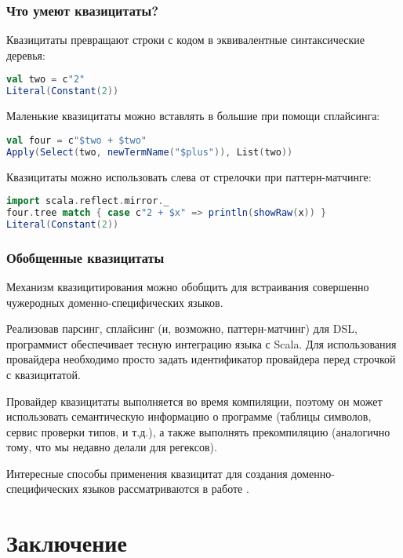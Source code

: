 \documentclass[hyperref={bookmarks=false}]{beamer}
\begin{document}
\begin{frame}[t,fragile]
\frametitle{Что умеют квазицитаты?}

Квазицитаты превращают строки с кодом в эквивалентные синтаксические деревья:

\begin{lstlisting}[language=scala]
val two = c"2"
Literal(Constant(2))
\end{lstlisting}

Маленькие квазицитаты можно вставлять в большие при помощи сплайсинга:

\begin{lstlisting}[language=scala]
val four = c"$two + $two"
Apply(Select(two, newTermName("$plus")), List(two))
\end{lstlisting}%

Квазицитаты можно использовать слева от стрелочки при паттерн-матчинге:

\begin{lstlisting}[language=scala]
import scala.reflect.mirror._
four.tree match { case c"2 + $x" => println(showRaw(x)) }
Literal(Constant(2))
\end{lstlisting}%
\end{frame}

\begin{frame}[t,fragile]
\frametitle{Обобщенные квазицитаты}
Механизм квазицитирования можно обобщить для встраивания совершенно чужеродных доменно-специфических языков.

Реализовав парсинг, сплайсинг (и, возможно, паттерн-матчинг) для DSL, программист обеспечивает тесную интеграцию языка с Scala. Для использования провайдера необходимо просто задать идентификатор провайдера перед строчкой с квазицитатой.

Провайдер квазицитаты выполняется во время компиляции, поэтому он может использовать семантическую информацию о программе (таблицы символов, сервис проверки типов, и т.д.), а также выполнять прекомпиляцию (аналогично тому, что мы недавно делали для регексов).

Интересные способы применения квазицитат для создания доменно-специфических языков рассматриваются в работе .

\end{frame}

\section{Заключение}
\end{document}
